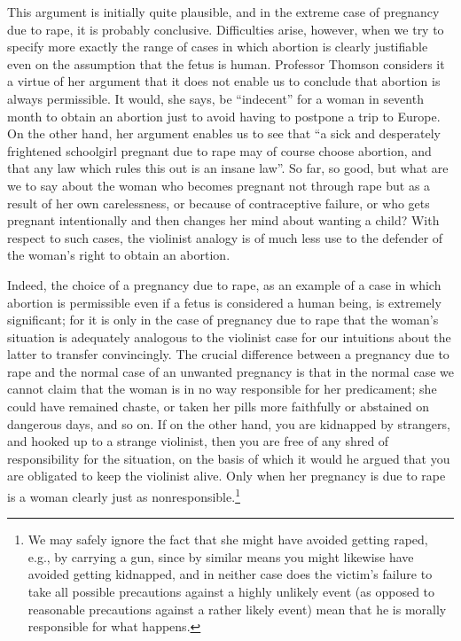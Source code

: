 This argument is initially quite plausible, and in the
extreme case of pregnancy due to rape, it is probably
conclusive. Difficulties arise, however, when we try to
specify more exactly the range of cases in which abortion
is clearly justifiable even on the assumption that the fetus
is human. Professor Thomson considers it a virtue of her
argument that it does not enable us to conclude that
abortion is always permissible. It would, she says, be
“indecent” for a woman in seventh month to obtain an
abortion just to avoid having to postpone a trip to Europe.
On the other hand, her argument enables us to see that ``a
sick and desperately frightened schoolgirl pregnant due to
rape may of course choose abortion, and that any law
which rules this out is an insane law”.\autocite[p. 65]{Thomson1} So far, so
good, but what are we to say about the woman who
becomes pregnant not through rape but as a result of her
own carelessness, or because of contraceptive failure, or
who gets pregnant intentionally and then changes her
mind about wanting a child? With respect to such cases,
the violinist analogy is of much less use to the defender of
the woman’s right to obtain an abortion.

Indeed, the choice of a pregnancy due to rape, as an
example of a case in which abortion is permissible even if
a fetus is considered a human being, is extremely
significant; for it is only in the case of pregnancy due to
rape that the woman’s situation is adequately analogous to
the violinist case for our intuitions about the latter to
transfer convincingly. The crucial difference between a
pregnancy due to rape and the normal case of an
unwanted pregnancy is that in the normal case we cannot
claim that the woman is in no way responsible for her
predicament; she could have remained chaste, or taken
her pills more faithfully or abstained on dangerous days,
and so on. If on the other hand, you are kidnapped by
strangers, and hooked up to a strange violinist, then you
are free of any shred of responsibility for the situation, on
the basis of which it would he argued that you are
obligated to keep the violinist alive. Only when her
pregnancy is due to rape is a woman clearly just as
nonresponsible.\footnote{We may safely ignore the fact that she might have avoided
getting raped, e.g., by carrying a gun, since by similar means
you might likewise have avoided getting kidnapped, and in
neither case does the victim's failure to take all possible
precautions against a highly unlikely event (as opposed to
reasonable precautions against a rather likely event) mean that
he is morally responsible for what happens.}

